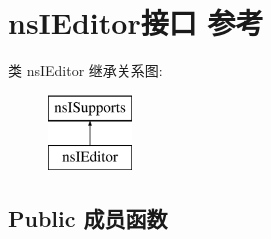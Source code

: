 \hypertarget{interfacens_i_editor}{}\section{ns\+I\+Editor接口 参考}
\label{interfacens_i_editor}
类 ns\+I\+Editor 继承关系图\+:\begin{figure}[H]
\begin{center}
\leavevmode
\includegraphics[height=2.000000cm]{interfacens_i_editor}
\end{center}
\end{figure}
\subsection*{Public 成员函数}

